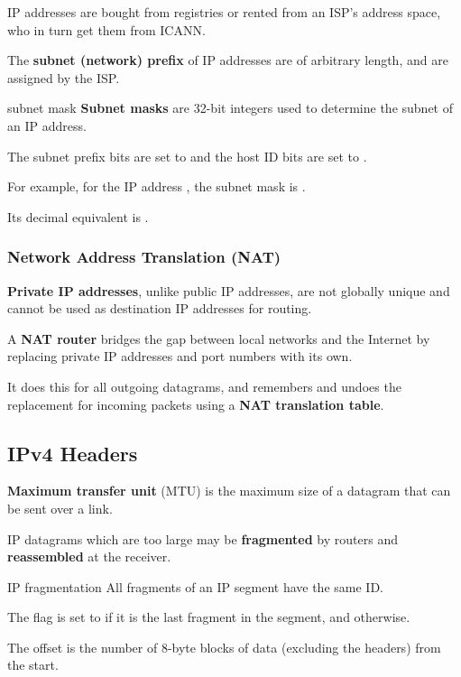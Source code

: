 IP addresses are bought from registries or rented from an ISP's address space, who in turn get them from ICANN.

The \textbf{subnet (network) prefix} of IP addresses are of arbitrary length, and are assigned by the ISP.

\begin{defn}{subnet mask}
    \textbf{Subnet masks} are 32-bit integers used to determine the subnet of an IP address.

    The subnet prefix bits are set to  and the host ID bits are set to .

    For example, for the IP address , the subnet mask is 
    .

    Its decimal equivalent is .
\end{defn}

\subsubsection{Network Address Translation (NAT)}
\textbf{Private IP addresses}, unlike public IP addresses, are not globally unique and cannot be used as
destination IP addresses for routing.

A \textbf{NAT router} bridges the gap between local networks and the Internet by replacing
private IP addresses and port numbers with its own.

It does this for all outgoing datagrams, and remembers and undoes the replacement for incoming packets
using a \textbf{NAT translation table}.


\subsection{IPv4 Headers}
\textbf{Maximum transfer unit} (MTU) is the maximum size of a datagram that can be sent over a link.

IP datagrams which are too large may be \textbf{fragmented} by routers and \textbf{reassembled} at the receiver.

\begin{defn}{IP fragmentation}
    All fragments of an IP segment have the same ID.

    The flag is set to  if it is the last fragment in the segment,
    and  otherwise.

    The offset is the number of 8-byte blocks of data (excluding the headers) from the start.
\end{defn}


